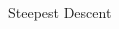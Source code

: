 \begin{frame}
\begin{columns}[t]
\begin{column}{0.5\textwidth}
\begin{greenblock}{Steepest Descent}
\begin{algorithm}[H]
        \end{algorithm}

      \end{greenblock}

    \end{column}

  \end{columns}

\end{frame}





